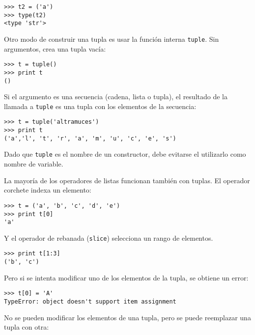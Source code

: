 \beforeverb
\begin{verbatim}
>>> t2 = ('a')
>>> type(t2)
<type 'str'>
\end{verbatim}
\afterverb
%
Otro modo de construir una tupla es usar la función interna {\tt tuple}.
Sin argumentos, crea una tupla vacía:


\beforeverb
\begin{verbatim}
>>> t = tuple()
>>> print t
()
\end{verbatim}
\afterverb
%
Si el argumento es una secuencia (cadena, lista o tupla), el resultado
de la llamada a {\tt tuple} es una tupla con los elementos de la secuencia:

\beforeverb
\begin{verbatim}
>>> t = tuple('altramuces')
>>> print t
('a','l', 't', 'r', 'a', 'm', 'u', 'c', 'e', 's')
\end{verbatim}
\afterverb
%
Dado que {\tt tuple} es el nombre de un constructor, debe evitarse
el utilizarlo como nombre de variable.

La mayoría de los operadores de listas funcionan también con tuplas. El operador corchete
indexa un elemento:


\beforeverb
\begin{verbatim}
>>> t = ('a', 'b', 'c', 'd', 'e')
>>> print t[0]
'a'
\end{verbatim}
\afterverb
%
Y el operador de rebanada ({\tt slice}) selecciona un rango de elementos.


\beforeverb
\begin{verbatim}
>>> print t[1:3]
('b', 'c')
\end{verbatim}
\afterverb
%
Pero si se intenta modificar uno de los elementos de la tupla, se
obtiene un error:


\beforeverb
\begin{verbatim}
>>> t[0] = 'A'
TypeError: object doesn't support item assignment
\end{verbatim}
\afterverb
%
No se pueden modificar los elementos de una tupla, pero se puede
reemplazar una tupla con otra:

